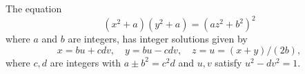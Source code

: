 \begin{proposition}
    The equation
\[
    (x^2+a)(y^2+a)=(az^2+b^2)^2
\]
    where $a$ and $b$ are integers, has integer solutions given by
\[
    x=bu+cdv,\quad y=bu-cdv,\quad z=u=(x+y)/(2b),
\]
    where $c,d$ are integers with $a\pm b^2=c^2d$ and $u,v$ satisfy $u^2-dv^2=1$.
\end{proposition}
